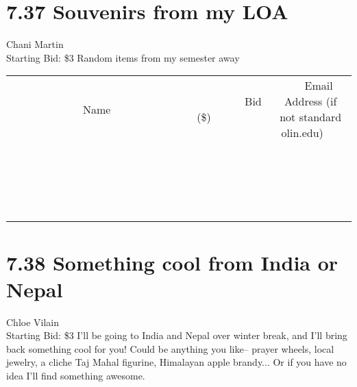 \documentclass[11pt]{article}
\begin{document}
\section*{7.37 Souvenirs from my LOA}
Chani Martin
\\
Starting Bid: \$3
\newline
Random items from my semester away
\\[3ex]
\begin{tabular}{c c c}
~~~~~~~~~~~~~Name~~~~~~~~~~~~~ & ~~~~~~~~~Bid (\$)~~~~~~~~~  & ~~~Email Address (if not standard olin.edu)~~~\\
 & & \\
\hline
 & & \\
\hline
 & & \\
\hline
 & & \\
\hline
 & & \\
\hline
 & & \\
\hline
 & & \\
\hline
 & & \\
\hline
 & & \\
\hline
 & & \\
\hline
 & & \\
\hline
 & & \\
\hline
 & & \\
\hline
 & & \\
\hline
 & & \\
\hline
 & & \\
\hline
 & & \\
\hline
 & & \\
\hline
 & & \\
\hline
\end{tabular}
\newpage
\section*{7.38 Something cool from India or Nepal}
Chloe Vilain
\\
Starting Bid: \$3
\newline
I'll be going to India and Nepal over winter break, and I'll bring back something cool for you! Could be anything you like-- prayer wheels, local jewelry, a cliche Taj Mahal figurine, Himalayan apple brandy... Or if you have no idea I'll find something awesome. 
\end{document}
